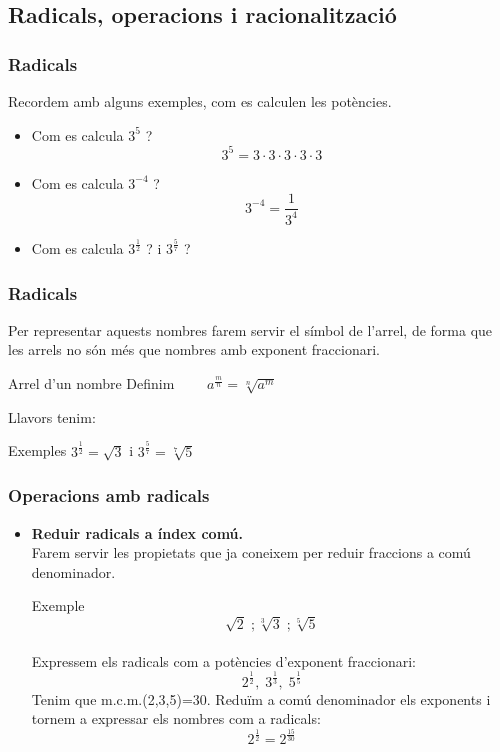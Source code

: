 \documentclass{beamer}
\begin{document}
\subsection{Radicals, operacions i racionalització}
\begin{frame}\frametitle{Radicals}
Recordem amb alguns exemples, com es calculen les potències.\pause
\begin{itemize}
\item
Com es calcula $3^{5}$ ?\pause
$$3^{5}=3\cdot3\cdot3\cdot3\cdot3$$\pause
\item
Com es calcula $3^{-4}$ ?\pause
$$3^{-4}=\frac{1}{3^{4}}$$\pause
\item
Com es calcula $3^{\frac{1}{2}}$ ? i $3^{\frac{5}{7}}$ ?\\
\end{itemize}
\end{frame}
\begin{frame}\frametitle{Radicals}
Per representar aquests nombres farem servir el símbol de l'arrel,
de forma que les arrels no són més que nombres amb exponent
fraccionari.\pause
\begin{block}{Arrel d'un nombre}
Definim $\qquad a^{\frac{m}{n}}=\sqrt[n]{a^{m}}$
\end{block}\pause
Llavors tenim:
\begin{exampleblock}{Exemples}
$3^{\frac{1}{2}}=\sqrt{3}$ i $3^{\frac{5}{7}}=\sqrt[7]{5}$
\end{exampleblock}
\end{frame}
\begin{frame}\frametitle{Operacions amb radicals}
\begin{itemize}
\item
\textbf{Reduir radicals a índex comú.}\\
Farem servir les propietats que ja coneixem per reduir fraccions a
comú denominador.\pause
\begin{exampleblock}{Exemple}
$$\sqrt{2}\; ; \sqrt[3]{3}\; ;\sqrt[5]{5}$$\\
Expressem els radicals com a potències d'exponent fraccionari:
$$2^{\frac{1}{2}},\; 3^{\frac{1}{3}},\; 5^{\frac{1}{5}}$$
Tenim que m.c.m.(2,3,5)=30. Reduïm a comú denominador els
exponents i tornem a expressar els nombres com a radicals:
$$2^{\frac{1}{2}}=2^{\frac{15}{30}}$$
\end{exampleblock}
\end{itemize}
\end{frame}
\end{document}
